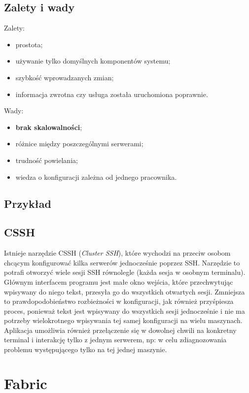 \subsection{Zalety i wady}
Zalety:
\begin{itemize}
\item prostota;
\item używanie tylko domyślnych komponentów systemu;
\item szybkość wprowadzanych zmian;
\item informacja zwrotna czy usługa została uruchomiona poprawnie.
\end{itemize}
Wady:
\begin{itemize}
\item \textbf{brak skalowalności};
\item różnice między poszczególnymi serwerami;
\item trudność powielania;
\item wiedza o konfiguracji zależna od jednego pracownika.
\end{itemize}
\subsection{Przykład}

\subsection{CSSH}
Istnieje narzędzie CSSH (\textit{Cluster SSH}), które wychodzi na przeciw osobom chcącym konfigurować kilka serwerów jednocześnie poprzez SSH.
Narzędzie to potrafi otworzyć wiele sesji SSH równolegle (każda sesja w osobnym terminalu).
Głównym interfacem programu jest małe okno wejścia, które przechwytując wpisywany do niego tekst, przesyła go do wszystkich otwartych sesji.
Zmniejsza to prawdopodobieństwo rozbieżności w konfiguracji, jak również przyśpiesza proces, ponieważ tekst jest wpisywany do wszystkich sesji jednocześnie i nie ma potrzeby wielokrotnego wpisywania tej samej konfiguracji na wielu maszynach.
Aplikacja umożliwia również przełączenie się w dowolnej chwili na konkretny terminal i interakcję tylko z jednym serwerem, np: w celu zdiagnozowania problemu występującego tylko na tej jednej maszynie.
\section{Fabric}
